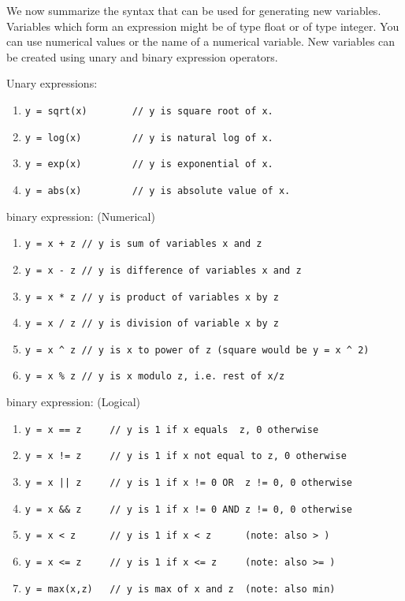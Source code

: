 \documentclass[12pt,a4paper]{article}
\begin{document}
\begin{description}
      We now summarize the syntax that can be used for generating new variables. Variables which form
      an expression might be of type float or of type integer.  You can use numerical values or the name
      of a numerical variable. New variables can be created using unary and binary expression operators.

      Unary expressions:
         \begin{enumerate}
            \item  \verb$y = sqrt(x)        // y is square root of x.$
            \item  \verb$y = log(x)         // y is natural log of x.$
            \item  \verb$y = exp(x)         // y is exponential of x.$
            \item  \verb$y = abs(x)         // y is absolute value of x.$     
         \end{enumerate}

      binary expression:  (Numerical) 
         \begin{enumerate}
            \item  \verb$y = x + z // y is sum of variables x and z$
            \item  \verb$y = x - z // y is difference of variables x and z$
            \item  \verb$y = x * z // y is product of variables x by z$
            \item  \verb$y = x / z // y is division of variable x by z$
            \item  \verb$y = x ^ z // y is x to power of z (square would be y = x ^ 2) $
            \item  \verb$y = x % z // y is x modulo z, i.e. rest of x/z $
         \end{enumerate}

      binary expression:  (Logical) 
         \begin{enumerate}
            \item  \verb$y = x == z     // y is 1 if x equals  z, 0 otherwise$
            \item  \verb$y = x != z     // y is 1 if x not equal to z, 0 otherwise$
            \item  \verb$y = x || z     // y is 1 if x != 0 OR  z != 0, 0 otherwise$
            \item  \verb$y = x && z     // y is 1 if x != 0 AND z != 0, 0 otherwise$
            \item  \verb$y = x < z      // y is 1 if x < z      (note: also > )$
            \item  \verb$y = x <= z     // y is 1 if x <= z     (note: also >= )$
            \item  \verb$y = max(x,z)   // y is max of x and z  (note: also min)$
         \end{enumerate}



\end{description}
\end{document}
